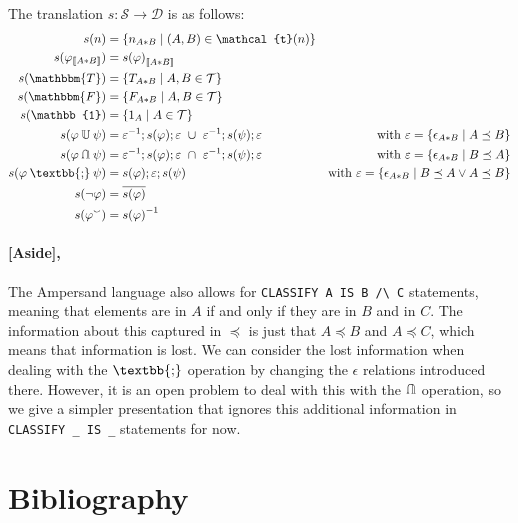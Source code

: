 \documentclass[12pt]{article}
\newcommand{\typesemi}{\mathbin{\text{\textbb{;}}}}
\newcommand{\typeunion}{\mathbin{\mathbb{U}}}
\newcommand{\typeinter}{\mathbin{\text{\rotatebox[origin=c]{180}{$\typeunion$}}}}
\newcommand{\typevee}{\mathbbm{T}}
\newcommand{\typenil}{\mathbbm{F}}
\newcommand{\typecomp}[1]{\neg{#1}}
\newcommand{\typeconv}[1]{{#1}^\smallsmile}
\newcommand{\typeident}{\mathbb{1}}
\newcommand{\typetyped}[2]{{#1}_{\llbracket #2 \rrbracket}}
\newcommand{\conv}[1]{{#1}^{-1}}
\begin{document}
The translation $s : \mathcal{S} \to \mathcal{D}$ is as follows:
\begin{align*}
s(n) &= \{n_{A*B} \mid (A,B)\in\mathcal{t}(n)\}\\
s(\typetyped{\varphi}{A*B}) &= \typetyped{s(\varphi)}{A*B}\\
s(\typevee) &= \{T_{A*B} \mid A,B\in\mathcal{T}\}\\
s(\typenil) &= \{F_{A*B} \mid A,B\in\mathcal{T}\}\\
s(\typeident) &= \{1_{A} \mid A\in\mathcal{T}\}\\
s(\varphi \typeunion \psi) &= \conv{\varepsilon};s(\varphi);\varepsilon\ \cup\ \conv{\varepsilon};s(\psi);\varepsilon&\quad\text{with $\varepsilon = \{\epsilon_{A*B} \mid A\preceq B \}$} \\
s(\varphi \typeinter \psi) &= \conv{\varepsilon};s(\varphi);\varepsilon\ \cap\ \conv{\varepsilon};s(\psi);\varepsilon&\quad\text{with $\varepsilon = \{\epsilon_{A*B} \mid B\preceq A \}$}\\
s(\varphi \typesemi \psi) &= s(\varphi);\varepsilon;s(\psi)&\text{with $\varepsilon = \{\epsilon_{A*B} \mid B\preceq A \vee A\preceq B \}$}\\
s(\typecomp{\varphi}) &= \overline{s(\varphi)}\\
s(\typeconv{\varphi}) &= \conv{s(\varphi)}
\end{align*}


\paragraph{[Aside],} The Ampersand language also allows for \verb=CLASSIFY A IS B /\ C= statements, meaning that elements are in $A$ if and only if they are in $B$ and in $C$.
The information about this captured in $\preceq$ is just that $A \preceq B$ and $A\preceq C$, which means that information is lost.
We can consider the lost information when dealing with the $\typesemi$ operation by changing the $\epsilon$ relations introduced there.
However, it is an open problem to deal with this with the $\typeinter$ operation, so we give a simpler presentation that ignores this additional information in \verb=CLASSIFY _ IS _= statements for now.



\section{Bibliography}



\end{document}

